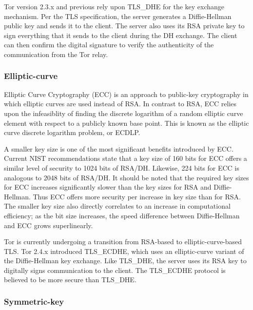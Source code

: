 \documentclass[journal]{IEEEtran}
\begin{document}
Tor version 2.3.x and previous rely upon TLS\_DHE for the key exchange mechanism. Per the TLS specification, the server generates a Diffie-Hellman public key and sends it to the client. The server also uses its RSA private key to sign everything that it sends to the client during the DH exchange. The client can then confirm the digital signature to verify the authenticity of the communication from the Tor relay.

\subsubsection{Elliptic-curve}

Elliptic Curve Cryptography (ECC) is an approach to public-key cryptography in which elliptic curves are used instead of RSA. In contrast to RSA, ECC relies upon the infeasiblity of finding the discrete logarithm of a random elliptic curve element with respect to a publicly known base point. This is known as the elliptic curve discrete logarithm problem, or ECDLP.

A smaller key size is one of the most significant benefits introduced by ECC. Current NIST recommendations state that a key size of 160 bits for ECC offers a similar level of security to 1024 bits of RSA/DH. Likewise, 224 bits for ECC is analogous to 2048 bits of RSA/DH. It should be noted that the required key sizes for ECC increases significantly slower than the key sizes for RSA and Diffie-Hellman. Thus ECC offers more security per increase in key size than for RSA. The smaller key size also directly correlates to an increase in computational efficiency; as the bit size increases, the speed difference between Diffie-Hellman and ECC grows superlinearly.\cite{CaseForECC}

Tor is currently undergoing a transition from RSA-based to elliptic-curve-based TLS. Tor 2.4.x introduced TLS\_ECDHE, which uses an elliptic-curve variant of the Diffie-Hellman key exchange. Like TLS\_DHE, the server uses its RSA key to digitally signs communication to the client. The TLS\_ECDHE protocol is believed to be more secure than TLS\_DHE.

\subsubsection{Symmetric-key}

\end{document}
